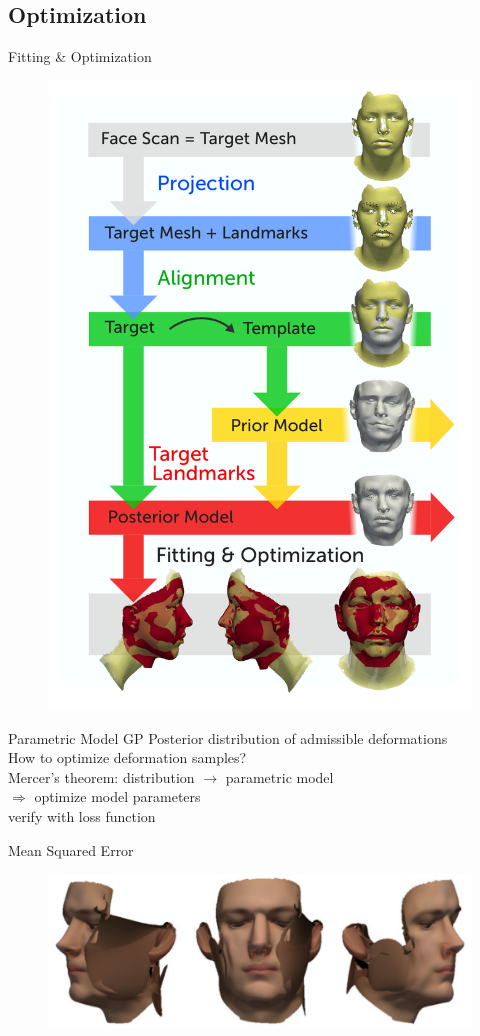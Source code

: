 \documentclass[xcolor=x11names,compress]{beamer}
\begin{document}
\subsection{Optimization}
\begin{frame}{Fitting \& Optimization}
\begin{figure}
    \includegraphics[width=.5\textwidth]{../resources/figures/pipeline.pdf}
\end{figure}
\end{frame}
\begin{frame}{Parametric Model}
    GP Posterior distribution of admissible deformations\\
    \bigskip
    How to optimize deformation samples?\\
    \bigskip
    Mercer's theorem: distribution $\rightarrow$ parametric model\\
    \bigskip
    $\Rightarrow$ optimize model parameters\\ verify with loss function
\end{frame}

\begin{frame}{Mean Squared Error}
    \begin{figure}
        \centering
        \includegraphics[width=\textwidth]{../resources/img/00029_meansquares_fit.pdf}
    \end{figure}
\end{frame}
\end{document}
